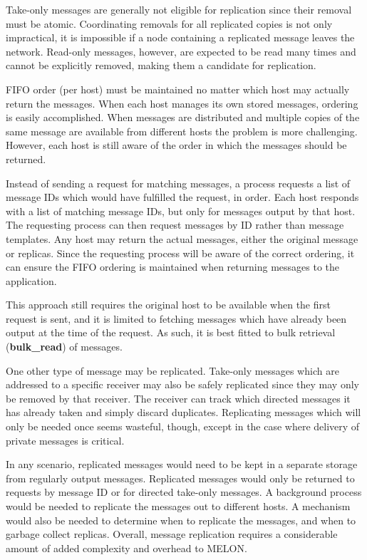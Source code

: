 Take-only messages are generally not eligible for replication since their removal must be atomic. Coordinating removals for all replicated copies is not only impractical, it is impossible if a node containing a replicated message leaves the network. Read-only messages, however, are expected to be read many times and cannot be explicitly removed, making them a candidate for replication.

FIFO order (per host) must be maintained no matter which host may actually return the messages. When each host manages its own stored messages, ordering is easily accomplished. When messages are distributed and multiple copies of the same message are available from different hosts the problem is more challenging. However, each host is still aware of the order in which the messages should be returned.

Instead of sending a request for matching messages, a process requests a list of message IDs which would have fulfilled the request, in order. Each host responds with a list of matching message IDs, but only for messages output by that host. The requesting process can then request messages by ID rather than message templates. Any host may return the actual messages, either the original message or replicas. Since the requesting process will be aware of the correct ordering, it can ensure the FIFO ordering is maintained when returning messages to the application.

This approach still requires the original host to be available when the first request is sent, and it is limited to fetching messages which have already been output at the time of the request. As such, it is best fitted to bulk retrieval (\textbf{bulk\_read}) of messages.

One other type of message may be replicated. Take-only messages which are addressed to a specific receiver may also be safely replicated since they may only be removed by that receiver. The receiver can track which directed messages it has already taken and simply discard duplicates. Replicating messages which will only be needed once seems wasteful, though, except in the case where delivery of private messages is critical.

In any scenario, replicated messages would need to be kept in a separate storage from regularly output messages. Replicated messages would only be returned to requests by message ID or for directed take-only messages. A background process would be needed to replicate the messages out to different hosts. A mechanism would also be needed to determine when to replicate the messages, and when to garbage collect replicas. Overall, message replication requires a considerable amount of added complexity and overhead to MELON.

